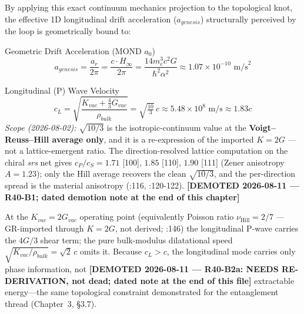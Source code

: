 By applying this exact continuum mechanics projection to the topological knot, the effective 1D longitudinal drift acceleration ($a_{genesis}$) structurally perceived by the loop is geometrically bound to:

\begin{resultbox}{Geometric Drift Acceleration (MOND $a_0$)}
\begin{equation}
a_{genesis}=\frac{a_r}{2\pi}=\frac{c\cdot H_{\infty}}{2\pi} = \frac{14 m_e^3 c^2 G}{\hbar^2 \alpha^2} \approx 1.07 \times 10^{-10} \text{ m/s}^2
\end{equation}
\end{resultbox}
\begin{resultbox}{Longitudinal (P) Wave Velocity}
\begin{equation}
    c_L = \sqrt{\frac{K_{vac} + \tfrac{4}{3}G_{vac}}{\rho_{bulk}}} = \sqrt{\tfrac{10}{3}}\,c \approx 5.48 \times 10^{8} \text{ m/s} \approx 1.83c
\end{equation}
\emph{Scope (2026-08-02):} $\sqrt{10/3}$ is the isotropic-continuum value at the \textbf{Voigt--Reuss--Hill average only}, and it is a re-expression of the imported $K = 2G$ --- not a lattice-emergent ratio. The direction-resolved lattice computation on the chiral \emph{srs} net gives $c_P/c_S = 1.71$ [100], $1.85$ [110], $1.90$ [111] (Zener anisotropy $A = 1.23$); only the Hill average recovers the clean $\sqrt{10/3}$, and the per-direction spread is the material anisotropy (:116, :120-122). \textbf{[DEMOTED 2026-08-11 --- R40-B1; dated demotion note at the end of this chapter]}
\end{resultbox}
At the $K_{vac}=2G_{vac}$ operating point (equivalently Poisson ratio $\nu_\text{Hill}=2/7$ --- GR-imported through $K = 2G$, not derived; :146) the longitudinal P-wave carries the $4G/3$ shear term; the pure bulk-modulus dilatational speed $\sqrt{K_{vac}/\rho_{bulk}}=\sqrt{2}\,c$ omits it. Because $c_L > c$, the longitudinal mode carries only phase information, not \textbf{[DEMOTED 2026-08-11 --- R40-B2a: NEEDS RE-DERIVATION, not dead; dated note at the end of this file]}
extractable energy---the same topological constraint demonstrated for the entanglement thread
(Chapter~3, \S3.7).

